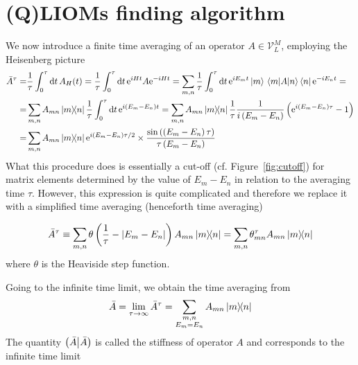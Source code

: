 \section{(Q)LIOMs finding algorithm\label{sec:algorithm}}
We now introduce a finite time averaging of an operator \(A\in \mathcal{V}_L^M\), employing the Heisenberg picture~\autocite{Mierzejewski2015Approx}
\begin{align}
  \bar{A}^{\tau} = & \frac{1}{\tau} \int_0^{\tau} \mathrm{d}t\, A_{H}(t) = \frac{1}{\tau} \int_0^{\tau} \mathrm{d}t\, \mathrm{e}^{i H t}A \mathrm{e}^{-i H t}
  =\sum_{m,n} \frac{1}{\tau} \int_0^{\tau} \mathrm{d}t\, \mathrm{e}^{i E_m t}\ket{m} \matrixel{m}{A}{n}\bra{n}  \mathrm{e}^{-i E_n t} = \nonumber{}           \\
  =                & \sum_{m,n} A_{mn}\ketbra{m}{n} \frac{1}{\tau} \int_0^{\tau} \mathrm{d}t \, \mathrm{e}^{i(E_m-E_n)t} =
  \sum_{m,n} A_{mn}\ketbra{m}{n} \frac{1}{\tau} \frac{1}{i\left(E_m-E_n\right)}\left(\mathrm{e}^{i\left(E_m-E_n\right)\tau}-1\right) \nonumber       \\
  =                & \sum_{m,n} A_{mn}\ketbra{m}{n}
  \mathrm{e}^{i\left(E_m-E_n\right)\tau/2}\times \frac{\sin{\left(\left(E_m-E_n\right)\tau\right)}}{\tau\left(E_m-E_n\right)}
  \label{eq:time_avg}
\end{align}
What this procedure does is essentially a cut-off (cf. Figure~\ref{fig:cutoff}) for matrix elements determined by the value of \(E_m-E_n\) in relation
to the averaging time \(\tau{}\). However, this expression is quite complicated and therefore we replace it with a simplified time
averaging (henceforth time averaging)
\begin{definition}
  \begin{equation}
    \bar{A}^{\tau} \equiv \sum_{m,n} \theta\left(\frac{1}{\tau} - \abs{E_m-E_n}\right) A_{mn} \ketbra{m}{n}
    = \sum_{m,n} \theta_{mn}^{\tau} A_{mn} \ketbra{m}{n}
    \label{def:simple time avg}
  \end{equation}
  where \(\theta{}\) is the Heaviside step function.
\end{definition}
Going to the infinite time limit, we obtain the time averaging
from~\textcite{Mierzejewski2015a}
\begin{equation}
  \bar{A} = \lim_{\tau \to \infty} \bar{A}^{\tau} = \sum_{ \substack{m,n\\E_m=E_n} } A_{mn} \ketbra{m}{n}
  \label{eq:inf time avg}
\end{equation}
The quantity \(\left(\bar{A} \middle| \bar{A}\right)\) is called the stiffness of operator \(A\) and corresponds to the infinite time limit
